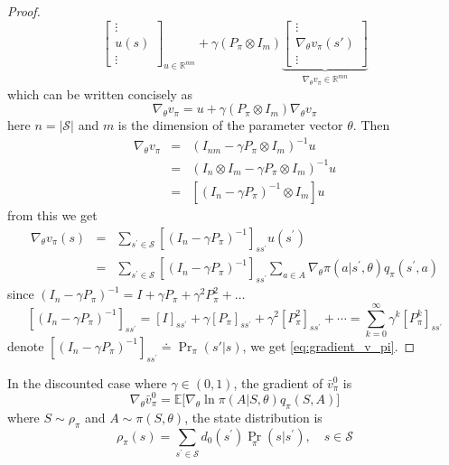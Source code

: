 \documentclass[10pt]{elegantbook}
\begin{document}
\begin{proof}
\[{\begin{bmatrix}
                \vdots \\ u(s) \\ \vdots
            \end{bmatrix}
        }_{u \in \mathbb R^{mn}}
        +
        \gamma(P_{\pi}\otimes I_{m})
        \underbrace{
            \begin{bmatrix}
                \vdots \\ \nabla_{\theta}v_{\pi}(s') \\ \vdots
            \end{bmatrix}
        }_{\nabla_{\theta}v_{\pi} \in \mathbb R^{mn}}
    \]
    which can be written concisely as
    \[
        \nabla_{\theta}v_{\pi}=u+\gamma(P_{\pi}\otimes I_{m})\nabla_{\theta}v_{\pi}
    \]
    here $n = |\mathcal S|$ and $m$ is the dimension of the parameter vector $\theta$.
    Then
    \begin{equation}
        \begin{array}{lll}
            \nabla_{\theta}v_{\pi} &=& (I_{n m}-\gamma P_{\pi}\otimes I_{m})^{-1}u \\
            &=& (I_{n}\otimes I_{m}-\gamma P_{\pi}\otimes I_{m})^{-1}u \\
            &=& \left[(I_{n}-\gamma P_{\pi})^{-1}\otimes I_{m}\right]u
        \end{array}
    \end{equation}
    from this we get
    \begin{equation}
        \begin{array}{lll}
            \nabla_{\theta}v_{\pi}(s) &=& \sum_{s^{\prime}\in{\mathcal{S}}}\left[(I_{n}-\gamma P_{\pi})^{-1}\right]_{s s^{\prime}}u(s^{\prime}) \\
            &=& \sum_{s^{\prime}\in{\mathcal{S}}}\left[(I_{n}-\gamma P_{\pi})^{-1}\right]_{s s^{\prime}}\sum_{a\in A}\nabla_{\theta}\pi(a|s^{\prime},\theta)q_{\pi}(s^{\prime},a)
        \end{array}
    \end{equation}
    since $(I_{n}-\gamma P_{\pi})^{-1}=I+\gamma P_{\pi}+\gamma^{2}P_{\pi}^{2}+\dots$
    \[
        [(I_{n}-\gamma P_{\pi})^{-1}]_{s s^{\prime}}=[I]_{s s^{\prime}}+\gamma[P_{\pi}]_{s s^{\prime}}+\gamma^{2}[P_{\pi}^{2}]_{s s^{\prime}}+\cdots=\sum_{k=0}^{\infty}\gamma^{k}[P_{\pi}^{k}]_{s s^{\prime}}
    \]
    denote $[(I_{n}-\gamma P_{\pi})^{-1}]_{s s^{\prime}} \doteq \Pr_{\pi}(s' | s)$, we get \ref{eq:gradient_v_pi}.
\end{proof}

\begin{theorem}
    In the discounted case where $\gamma \in (0, 1)$, the gradient of $\bar v_{\pi}^0$ is
    \[
        \nabla_{\theta}\bar{v}_{\pi}^{0}=\mathbb{E}\big[\nabla_{\theta}\ln\pi(A|S,\theta)q_{\pi}(S,A)\big]
    \]
    where $S \sim \rho_{\pi}$ and $A \sim \pi(S, \theta)$, the state distribution is
    \begin{equation}
        \rho_{\pi}(s)=\sum_{s^{\prime}\in{\mathcal{S}}}d_{0}(s^{\prime})\Pr_{\pi}(s|s^{\prime}), \quad s\in{\mathcal{S}}
    \end{equation}
\end{theorem}
\end{document}
